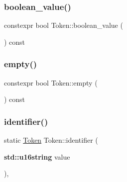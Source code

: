 \mbox{\label{class_token_a72e4ccf32f393af43e08e7ff04e45f95}} 
\subsubsection{\texorpdfstring{boolean\+\_\+value()}{boolean\_value()}}
{\footnotesize\ttfamily constexpr bool Token\+::boolean\+\_\+value (\begin{DoxyParamCaption}{ }\end{DoxyParamCaption}) const\hspace{0.3cm}{\ttfamily [inline]}}

\mbox{\label{class_token_aaed20163d2aee9be88f80f28ba7f9200}} 
\subsubsection{\texorpdfstring{empty()}{empty()}}
{\footnotesize\ttfamily constexpr bool Token\+::empty (\begin{DoxyParamCaption}{ }\end{DoxyParamCaption}) const\hspace{0.3cm}{\ttfamily [inline]}}

\mbox{\label{class_token_af8cc69259b72cb8fb6f86da202564f15}} 
\subsubsection{\texorpdfstring{identifier()}{identifier()}}
{\footnotesize\ttfamily static \hyperlink{class_token}{Token} Token\+::identifier (\begin{DoxyParamCaption}\item[{\textbf{ std\+::u16string}}]{value }\end{DoxyParamCaption})\hspace{0.3cm}{\ttfamily [inline]}, {\ttfamily [static]}}

\mbox{\label{class_token_ab97eb94f13e337e95b9a31a1956085ed}} 
